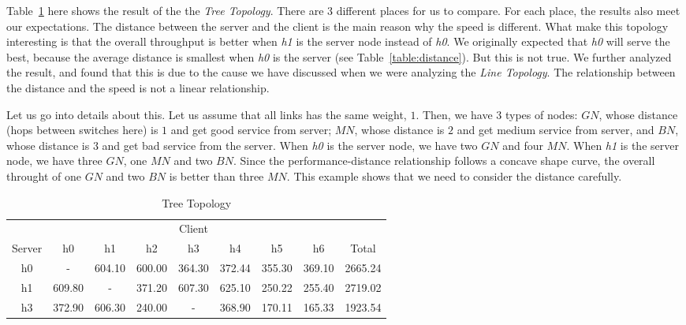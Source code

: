 Table~\ref{table:tree} here shows the result of the the {\it Tree Topology}. There are 3
different places for us to compare. For each place, the results also meet our expectations.
The distance between the server and the client is the main reason why the speed is different.
What make this topology interesting is that the overall throughput is better when {\it h1} is the 
server node instead of {\it h0}. We originally expected that {\it h0} will serve the best, because the 
average distance is smallest when {\it h0} is the server (see Table~\ref{table:distance}). 
But this is not true. We further analyzed
the result, and found that this is due to the cause we have discussed when we were analyzing
the {\it Line Topology}. The relationship between the distance and the speed is not a linear
relationship.

Let us go into details about this. Let us assume that all links has the same weight, $1$. Then,
we have $3$ types of nodes: $GN$, whose distance (hops between switches here) is $1$ and get good service from server; $MN$,
whose distance is $2$ and get medium service from server, and $BN$, whose distance is $3$ and get
bad service from the server. When {\it h0} is the server node, we have two $GN$ and four $MN$. When {\it h1}
is the server node, we have three $GN$, one $MN$ and two $BN$. Since the performance-distance 
relationship follows a concave shape curve, the overall throught of one $GN$ and two $BN$ is better
than three $MN$. This example shows that we need to consider the distance carefully.
\begin{table}
	\renewcommand{\arraystretch}{1.3}
	\caption{Tree Topology}
	\label{table:tree}
	\setlength\tabcolsep{4pt}
	\centering
	\begin{tabular}{|c||c|c|c|c|c|c|c||c|}
		\hline
		       & \multicolumn{7}{c||}{Client} &  \\ \hhline{|~||-------||~|}
		Server & h0 & h1 & h2 & h3 & h4 & h5 & h6 & Total\\
\hline\hline
h0 &    -     &  604.10  &  600.00  &  364.30  &  372.44  &  355.30  &  369.10  & 2665.24 \\
\hline
h1 &  609.80  &     -    &  371.20  &  607.30  &  625.10  &  250.22  &  255.40  & 2719.02 \\
\hline
h3 &  372.90  &  606.30  &  240.00  &     -    &  368.90  &  170.11  &  165.33  & 1923.54 \\
\hline
	\end{tabular}
\end{table}

